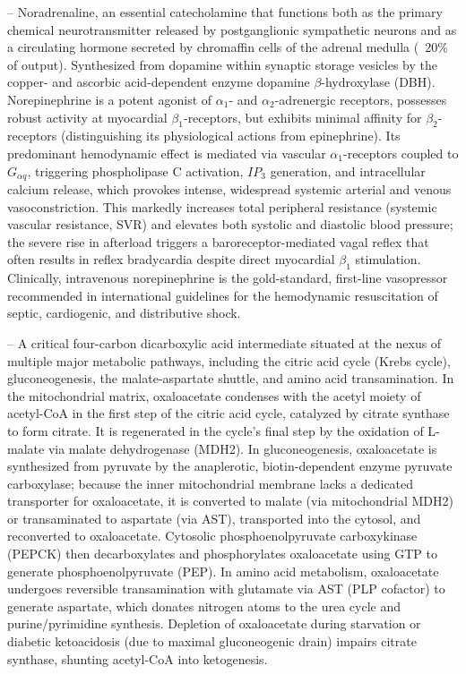 -- Noradrenaline, an essential catecholamine that functions both as the primary chemical neurotransmitter released by postganglionic sympathetic neurons and as a circulating hormone secreted by chromaffin cells of the adrenal medulla (~20\% of output). Synthesized from dopamine within synaptic storage vesicles by the copper- and ascorbic acid-dependent enzyme dopamine $\beta$-hydroxylase (DBH). Norepinephrine is a potent agonist of $\alpha_1$- and $\alpha_2$-adrenergic receptors, possesses robust activity at myocardial $\beta_1$-receptors, but exhibits minimal affinity for $\beta_2$-receptors (distinguishing its physiological actions from epinephrine). Its predominant hemodynamic effect is mediated via vascular $\alpha_1$-receptors coupled to $G_{\alpha q}$, triggering phospholipase C activation, $IP_3$ generation, and intracellular calcium release, which provokes intense, widespread systemic arterial and venous vasoconstriction. This markedly increases total peripheral resistance (systemic vascular resistance, SVR) and elevates both systolic and diastolic blood pressure; the severe rise in afterload triggers a baroreceptor-mediated vagal reflex that often results in reflex bradycardia despite direct myocardial $\beta_1$ stimulation. Clinically, intravenous norepinephrine is the gold-standard, first-line vasopressor recommended in international guidelines for the hemodynamic resuscitation of septic, cardiogenic, and distributive shock.

-- A critical four-carbon dicarboxylic acid intermediate situated at the nexus of multiple major metabolic pathways, including the citric acid cycle (Krebs cycle), gluconeogenesis, the malate-aspartate shuttle, and amino acid transamination. In the mitochondrial matrix, oxaloacetate condenses with the acetyl moiety of acetyl-CoA in the first step of the citric acid cycle, catalyzed by citrate synthase to form citrate. It is regenerated in the cycle's final step by the oxidation of L-malate via malate dehydrogenase (MDH2). In gluconeogenesis, oxaloacetate is synthesized from pyruvate by the anaplerotic, biotin-dependent enzyme pyruvate carboxylase; because the inner mitochondrial membrane lacks a dedicated transporter for oxaloacetate, it is converted to malate (via mitochondrial MDH2) or transaminated to aspartate (via AST), transported into the cytosol, and reconverted to oxaloacetate. Cytosolic phosphoenolpyruvate carboxykinase (PEPCK) then decarboxylates and phosphorylates oxaloacetate using GTP to generate phosphoenolpyruvate (PEP). In amino acid metabolism, oxaloacetate undergoes reversible transamination with glutamate via AST (PLP cofactor) to generate aspartate, which donates nitrogen atoms to the urea cycle and purine/pyrimidine synthesis. Depletion of oxaloacetate during starvation or diabetic ketoacidosis (due to maximal gluconeogenic drain) impairs citrate synthase, shunting acetyl-CoA into ketogenesis.

